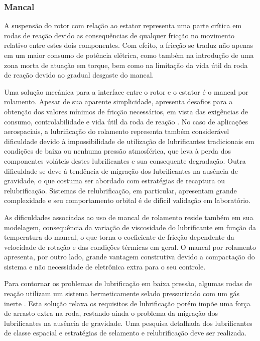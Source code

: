 \subsubsection{Mancal}\label{sec:mancal}

A suspensão do rotor com relação ao estator representa uma parte crítica em rodas de reação \cite{taniwaki2003experimental} devido as consequências de qualquer fricção no movimento relativo entre estes dois componentes. Com efeito, a fricção se traduz não apenas em um maior consumo de potência elétrica, como também na introdução de uma zona morta de atuação em torque, bem como na limitação da vida útil da roda de reação devido ao gradual desgaste do mancal. 

Uma solução mecânica para a interface entre o rotor e o estator é o mancal por rolamento. Apesar de sua aparente simplicidade, apresenta desafios para a obtenção dos valores mínimos de fricção necessários, em vista das exigências de consumo, controlabilidade e vida útil da roda de reação \cite{krishnan2010lubrication}. No caso de aplicações aerospaciais, a lubrificação do rolamento representa também considerável dificuldade devido à impossibilidade de utilização de lubrificantes tradicionais em condições de baixa ou nenhuma pressão atmosférica, que leva à perda dos componentes voláteis destes lubrificantes e sua consequente degradação. Outra dificuldade se deve à tendência de migração dos lubrificantes na ausência de gravidade, o que costuma ser abordado com estratégias de recaptura ou relubrificação. Sistemas de relubrificação, em particular, apresentam grande complexidade e seu comportamento orbital é de difícil validação em laboratório.

As dificuldades associadas ao uso de mancal de rolamento reside também em sua modelagem, consequência da variação de viscosidade do lubrificante em função da temperatura do mancal, o que torna o coeficiente de fricção dependente da velocidade de rotação e das condições térmicas em geral. O mancal por rolamento apresenta, por outro lado, grande vantagem construtiva devido a compactação do sistema e não necessidade de eletrônica extra para o seu controle. 

Para contornar os problemas de lubrificação em baixa pressão, algumas rodas de reação  utilizam um sistema hermeticamente selado pressurizado com um gás inerte \cite{sathyan2010long}. Esta solução relaxa os requisitos de lubrificação porém impõe uma força de arrasto extra na roda, restando ainda o problema da migração dos lubrificantes na ausência de gravidade. Uma pesquisa detalhada dos lubrificantes de classe espacial e estratégias de selamento e relubrificação deve ser realizada.

